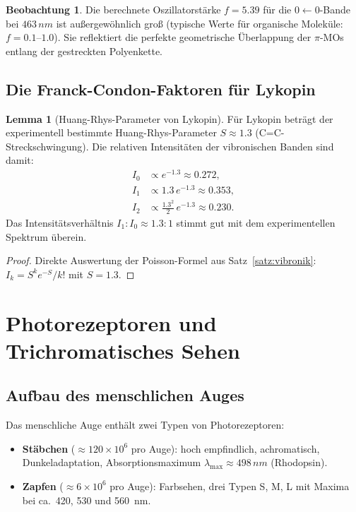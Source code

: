 ﻿\documentclass[a4paper,12pt]{article}
\theoremstyle{definition}
\newtheorem{lemma}{Lemma}
\newtheorem{beobachtung}{Beobachtung}
\begin{document}
\begin{beobachtung}
Die berechnete Oszillatorstärke $f = 5.39$ für die $0\leftarrow0$-Bande bei
$463\,\si{nm}$ ist außergewöhnlich groß (typische Werte für organische Moleküle:
$f = 0.1$--$1.0$). Sie reflektiert die perfekte geometrische Überlappung der
$\pi$-MOs entlang der gestreckten Polyenkette.
\end{beobachtung}

\subsection{Die Franck-Condon-Faktoren für Lykopin}

\begin{lemma}[Huang-Rhys-Parameter von Lykopin]
Für Lykopin beträgt der experimentell bestimmte Huang-Rhys-Parameter
$S \approx 1.3$ (C=C-Streckschwingung). Die relativen Intensitäten
der vibronischen Banden sind damit:
\begin{align*}
  I_0 &\propto e^{-1.3} \approx 0.272, \\
  I_1 &\propto 1.3\,e^{-1.3} \approx 0.353, \\
  I_2 &\propto \frac{1.3^2}{2}\,e^{-1.3} \approx 0.230.
\end{align*}
Das Intensitätsverhältnis $I_1 : I_0 \approx 1.3 : 1$ stimmt gut mit dem experimentellen
Spektrum überein.
\end{lemma}

\begin{proof}
Direkte Auswertung der Poisson-Formel aus Satz~\ref{satz:vibronik}:
$I_k = S^k e^{-S} / k!$ mit $S = 1.3$.
\end{proof}

\section{Photorezeptoren und Trichromatisches Sehen}

\subsection{Aufbau des menschlichen Auges}

Das menschliche Auge enthält zwei Typen von Photorezeptoren:
\begin{itemize}
  \item \textbf{Stäbchen} ($\approx 120 \times 10^6$ pro Auge): hoch empfindlich, achromatisch,
        Dunkeladaptation, Absorptionsmaximum $\lambda_{\max} \approx 498\,\si{nm}$ (Rhodopsin).
  \item \textbf{Zapfen} ($\approx 6 \times 10^6$ pro Auge): Farbsehen, drei Typen S, M, L
        mit Maxima bei ca.\ 420, 530 und 560~nm.
\end{itemize}
\end{document}
